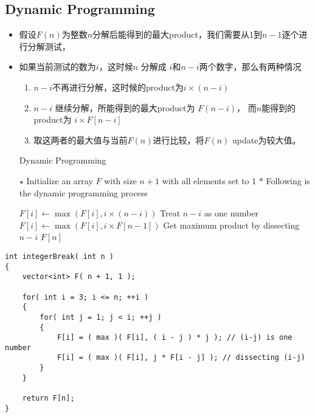 \subsection{Dynamic Programming}
\begin{itemize}
\item 假设$ F(n) $为整数$n$分解后能得到的最大product，我们需要从1到$ n-1 $逐个进行分解测试，
\item 如果当前测试的数为$ i $，这时候$ n $ 分解成 $ i $和$ n-i $两个数字，那么有两种情况
\begin{enumerate}
\item $ n-i $不再进行分解，这时候的product为$i \times (n-i)$
\item $n-i$ 继续分解，所能得到的最大product为 $ F(n-i) $， 而$ n $能得到的product为 $ i\times F[n-i] $
\item 取这两者的最大值与当前$ F(n) $进行比较，将$ F(n) $ update为较大值。
\end{enumerate}

\begin{algorithm}[H]
\caption{Dynamic Programming}
\begin{algorithmic}[1]
\State $\star$ Initialize an array $F$ with size $n+1$ with all elements set to 1
\State $\ast$ Following is the dynamic programming process
\end{algorithmic}
\end{algorithm}
\begin{algorithm}[H]
\begin{algorithmic}[1]
\State $F[i]\gets \max(F[i], i\times (n-i))$ \Comment Treat $n-i$ as one number
\State $F[i]\gets \max(F[i], i\times F[n-1])$ \Comment Get maximum product by dissecting $n-i$
\EndFor
\EndFor
\State \Return $F[n]$
\EndProcedure
\end{algorithmic}
\end{algorithm}
\end{itemize}

\setcounter{lstlisting}{0}
\begin{lstlisting}[style=customc, caption={Dynamic Programming}]
int integerBreak( int n )
{
    vector<int> F( n + 1, 1 );

    for( int i = 3; i <= n; ++i )
    {
        for( int j = 1; j < i; ++j )
        {
            F[i] = ( max )( F[i], ( i - j ) * j ); // (i-j) is one number
            F[i] = ( max )( F[i], j * F[i - j] ); // dissecting (i-j)
        }
    }

    return F[n];
}

\end{lstlisting}
